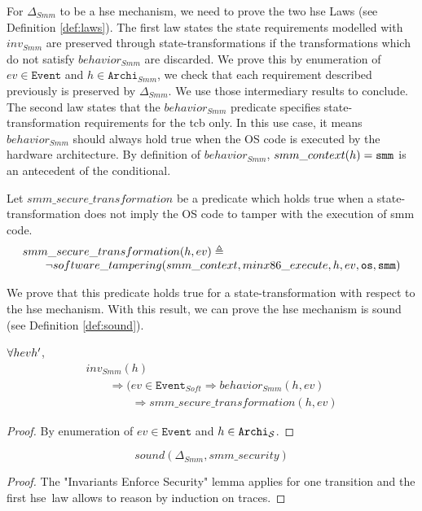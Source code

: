 For $\Delta_{Smm}$ to be a \ac{hse} mechanism, we need to prove the two \ac{hse}
Laws (see Definition \ref{def:laws}).
%
The first law states the state requirements modelled with $inv_{Smm}$ are
preserved through state-transformations if the transformations which do not
satisfy $behavior_{Smm}$ are discarded.
%
We prove this by enumeration of $ev \in \texttt{Event}$ and
$h \in \texttt{Archi}_{Smm}$, we check that each requirement described
previously is preserved by $\Delta_{Smm}$.
%
We use those intermediary results to conclude.
%
The second law states that the $behavior_{Smm}$ predicate specifies
state-trans\-formation requirements for the \ac{tcb} only.
%
In this use case, it means $behavior_{Smm}$ should always hold true when the OS
code is executed by the hardware architecture.
%
By definition of $behavior_{Smm}$, $smm\_context(h) = \mathtt{smm}$ is an
antecedent of the conditional.

Let $smm\_secure\_transformation$ be a predicate which holds true when a
state-transformation does not imply the OS code to tamper with the execution of
\ac{smm} code.
\[ \begin{array}{l}
     smm\_secure\_transformation(h, ev) \triangleq \\
     \qquad \neg software\_tampering(smm\_context, minx86\_execute, h, ev,
     \mathtt{os}, \mathtt{smm})
   \end{array} \]

 We prove that this predicate holds true for a state-transformation with respect
 to the \ac{hse} mechanism. With this result, we can prove the \ac{hse}
 mechanism is sound (see Definition \ref{def:sound}).

\begin{lemma}
  $\forall \transitionLTS{Smmx86}{h}{ev}{h'}$,
  \[ \begin{array}{l}
       inv_{Smm}(h) \\
       \qquad \Rightarrow (ev \in \texttt{Event}_{Soft} \Rightarrow
       behavior_{Smm}(h,ev) \\
       \qquad\qquad \Rightarrow smm\_secure\_transformation(h, ev)
     \end{array} \]

  \begin{proof}
    By enumeration of $ev \in \texttt{Event}$ and
    $h \in \texttt{Archi}_{\mathcal{S}}$.
  \end{proof}
\end{lemma}

\begin{theorem}
  \[ sound(\Delta_{Smm}, smm\_security) \]
  \begin{proof}
    The "Invariants Enforce Security" lemma applies for one transition and the
    first \ac{hse} law allows to reason by induction on traces.
  \end{proof}
\end{theorem}

